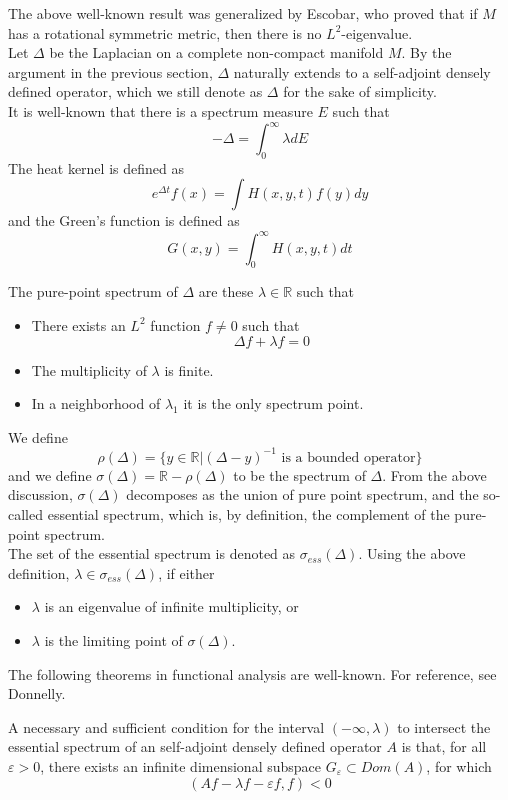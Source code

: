 The above well-known result was generalized by Escobar, who proved that if $M$
has a rotational symmetric metric, then there is no $L^2$-eigenvalue.
\\

Let $\Delta$ be the Laplacian on a complete non-compact manifold $M$. By the
argument in the previous section, $\Delta$ naturally extends to a self-adjoint
densely defined operator, which we still denote as $\Delta$ for the sake of
simplicity.
\\

It is well-known that there is a spectrum measure $E$ such that
\[
-\Delta = \int_0^{\infty} \lambda dE
\]
The heat kernel is defined as
\[
e^{\Delta t}f(x) = \int H(x,y,t)f(y)dy
\]
and the Green's function is defined as
\[
G(x,y) = \int_0^\infty H(x,y,t)dt
\]

The pure-point spectrum of $\Delta$ are these $\lambda\in\mathbb{R}$ such that
\begin{itemize}
\item[\ding{172}] There exists an $L^2$ function $f\neq 0$ such that
\[
\Delta f + \lambda f = 0
\]
\item[\ding{173}] The multiplicity of $\lambda$ is finite.
\item[\ding{174}] In a neighborhood of $\lambda_1$ it is the only spectrum 
point.
\end{itemize}

We define
\[
\rho(\Delta) = \{y\in\mathbb{R}|(\Delta-y)^{-1}\mbox{ is a bounded operator}\}
\]
and we define $\sigma(\Delta) = \mathbb{R} - \rho(\Delta)$ to be the spectrum
of $\Delta$. From the above discussion, $\sigma(\Delta)$ decomposes as the
union of pure point spectrum, and the so-called essential spectrum, which is,
by definition, the complement of the pure-point spectrum.
\\

The set of the essential spectrum is denoted as $\sigma_{ess}(\Delta)$. Using
the above definition, $\lambda\in\sigma_{ess}(\Delta)$, if either
\begin{itemize}
\item[\ding{172}] $\lambda$ is an eigenvalue of infinite multiplicity, or
\item[\ding{173}] $\lambda$ is the limiting point of $\sigma(\Delta)$.
\end{itemize}

The following theorems in functional analysis are well-known. For reference,
see Donnelly.

\begin{theorem}
A necessary and sufficient condition for the interval $(-\infty, \lambda)$ to
intersect the essential spectrum of an self-adjoint densely defined operator
$A$ is that, for all $\varepsilon > 0$, there exists an infinite dimensional
subspace $G_\varepsilon \subset Dom(A)$, for which
\[
(Af - \lambda f - \varepsilon f, f) < 0
\]
\end{theorem}


